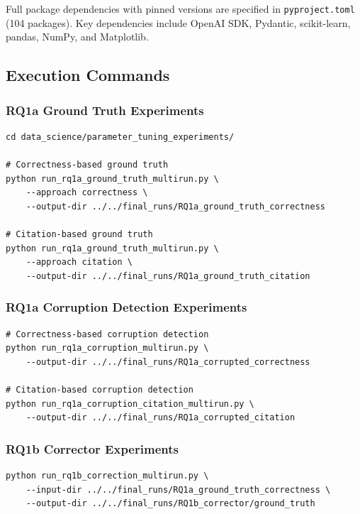 \noindent Full package dependencies with pinned versions are specified in \texttt{pyproject.toml} (104 packages). Key dependencies include OpenAI SDK, Pydantic, scikit-learn, pandas, NumPy, and Matplotlib.

\subsection{Execution Commands}
\label{sec:execution_commands}

\subsubsection{RQ1a Ground Truth Experiments}

\begin{verbatim}
cd data_science/parameter_tuning_experiments/

# Correctness-based ground truth
python run_rq1a_ground_truth_multirun.py \
    --approach correctness \
    --output-dir ../../final_runs/RQ1a_ground_truth_correctness

# Citation-based ground truth
python run_rq1a_ground_truth_multirun.py \
    --approach citation \
    --output-dir ../../final_runs/RQ1a_ground_truth_citation
\end{verbatim}

\subsubsection{RQ1a Corruption Detection Experiments}

\begin{verbatim}
# Correctness-based corruption detection
python run_rq1a_corruption_multirun.py \
    --output-dir ../../final_runs/RQ1a_corrupted_correctness

# Citation-based corruption detection
python run_rq1a_corruption_citation_multirun.py \
    --output-dir ../../final_runs/RQ1a_corrupted_citation
\end{verbatim}

\subsubsection{RQ1b Corrector Experiments}

\begin{verbatim}
python run_rq1b_correction_multirun.py \
    --input-dir ../../final_runs/RQ1a_ground_truth_correctness \
    --output-dir ../../final_runs/RQ1b_corrector/ground_truth
\end{verbatim}

